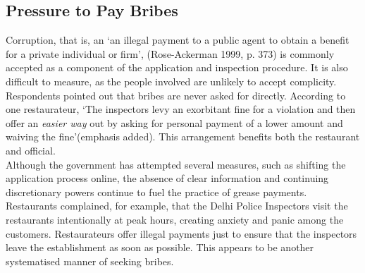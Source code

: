 \documentclass[a4paper, 12pt]{article}
\begin{document}
		\subsection{Pressure to Pay Bribes}
		Corruption, that is, an ‘an illegal payment to a public agent to obtain a benefit for a private individual or firm’, (Rose-Ackerman 1999, p. 373) is commonly accepted as a component of the application and inspection procedure. It is also difficult to measure, as the people involved are unlikely to accept complicity. Respondents pointed out that bribes are never asked for directly. According to one restaurateur, ‘The inspectors levy an exorbitant fine for a violation and then offer an \textit{easier way} out by asking for personal payment of a lower amount and waiving the fine’(emphasis added). This arrangement benefits both the restaurant and official.\\
		Although the government has attempted several measures, such as shifting the application process online, the absence of clear information and continuing discretionary powers continue to fuel the practice of grease payments. Restaurants complained, for example, that the Delhi Police Inspectors visit the restaurants intentionally at peak hours, creating anxiety and panic among the customers. Restaurateurs offer illegal payments just to ensure that the inspectors leave the establishment as soon as possible. This appears to be another systematised manner of seeking bribes.
				
\end{document}
